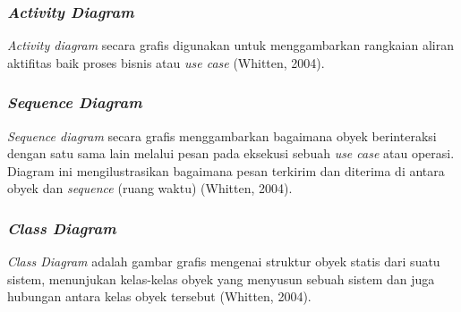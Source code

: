     \subsubsection{\emph{Activity Diagram}}
    \emph{Activity diagram} secara grafis digunakan untuk menggambarkan rangkaian aliran aktifitas baik proses bisnis atau \emph{use case} (Whitten, 2004).

    \subsubsection{\emph{Sequence Diagram}}
    \emph{Sequence diagram} secara grafis menggambarkan bagaimana obyek berinteraksi dengan satu sama lain melalui pesan pada eksekusi sebuah \emph{use case} atau operasi. Diagram ini mengilustrasikan bagaimana pesan terkirim dan diterima di antara obyek dan \emph{sequence} (ruang waktu) (Whitten, 2004).

    \subsubsection{\emph{Class Diagram}}
    \emph{Class Diagram} adalah gambar grafis mengenai struktur obyek statis dari suatu sistem, menunjukan kelas-kelas obyek yang menyusun sebuah sistem dan juga hubungan antara kelas obyek tersebut (Whitten, 2004).

